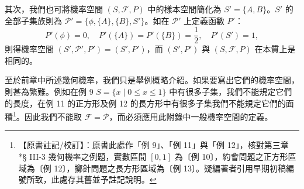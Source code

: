 其次，我們也可將機率空間 $(S, \mathscr{F}, P)$ 中的樣本空間簡化為 $S' = \{A, B\}$。$S'$ 的全部子集族則為 $\mathscr{P}' = \{\phi, \{A\}, \{B\}, S'\}$。如在 $\mathscr{P}'$ 上定義函數 $P'$：
\[
P'(\phi) = 0, \quad P'(\{A\}) = P'(\{B\}) = \frac{1}{2}, \quad P'(S') = 1,
\]
則得機率空間 $(S', \mathscr{P}', P') = (S', P')$，而 $(S', P')$ 與 $(S, \mathscr{F}, P)$ 在本質上是相同的。

\enlargethispage{2\baselineskip}
至於前章中所述幾何機率，我們只是舉例概略介紹。如果要寫出它們的機率空間，則甚為繁難。例如在例 9 $S=\{x \mid 0 \le x \le 1\}$ 中有很多子集，我們不能規定它們的長度，在例 11 的正方形及例 12 的長方形中有很多子集我們不能規定它們的面積\label{note:b5s-ch4-p139-geom-ex-num}\footnote{【原書註記/校訂】：原書此處作「例 9」、「例 11」與「例 12」，核對第三章 *§ III-3 幾何機率之例題，實數區間 $[0,1]$ 為〔例 10〕，約會問題之正方形區域為〔例 12〕，擲針問題之長方形區域為〔例 13〕。疑編著者引用早期初稿編號所致，此處存其舊並予註記說明。}。因此我們不能取 $\mathscr{F} = \mathscr{P}$，而必須應用此附錄中一般機率空間的定義。
